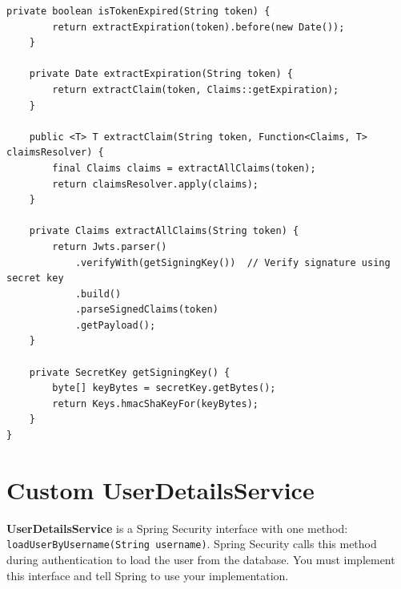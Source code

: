\documentclass[12pt,a4paper]{report}
\newcommand{\code}[1]{\texttt{\textcolor{keywordblue}{#1}}}
\begin{document}
\begin{lstlisting}[caption=JwtUtils.java -- JWT Generation and Validation]
    private boolean isTokenExpired(String token) {
        return extractExpiration(token).before(new Date());
    }

    private Date extractExpiration(String token) {
        return extractClaim(token, Claims::getExpiration);
    }

    public <T> T extractClaim(String token, Function<Claims, T> claimsResolver) {
        final Claims claims = extractAllClaims(token);
        return claimsResolver.apply(claims);
    }

    private Claims extractAllClaims(String token) {
        return Jwts.parser()
            .verifyWith(getSigningKey())  // Verify signature using secret key
            .build()
            .parseSignedClaims(token)
            .getPayload();
    }

    private SecretKey getSigningKey() {
        byte[] keyBytes = secretKey.getBytes();
        return Keys.hmacShaKeyFor(keyBytes);
    }
}
\end{lstlisting}

\section{Custom UserDetailsService}

\begin{tcolorbox}[notebox]
\textbf{UserDetailsService} is a Spring Security interface with one method: \code{loadUserByUsername(String username)}. Spring Security calls this method during authentication to load the user from the database. You must implement this interface and tell Spring to use your implementation.
\end{tcolorbox}
\end{document}
